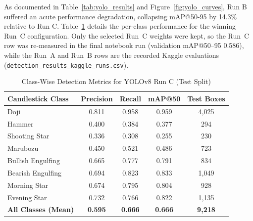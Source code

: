 \documentclass[10pt,journal]{IEEEtran}
\begin{document}
\begin{table}[htbp]
\centering
\caption{YOLOv8 Test Split Object Detection Performance (From Scratch)}
\label{tab:yolo_results}
\end{table}

As documented in Table~\ref{tab:yolo_results} and Figure~\ref{fig:yolo_curves}, Run B suffered an acute performance degradation, collapsing mAP@50-95 by 14.3\% relative to Run C. Table~\ref{tab:yolo_class} details the per-class performance for the winning Run~C configuration. Only the selected Run~C weights were kept, so the Run~C row was re-measured in the final notebook run (validation mAP@50--95 0.586), while the Run~A and Run~B rows are the recorded Kaggle evaluations (\texttt{detection\_results\_kaggle\_runs.csv}).

\begin{table}[htbp]
\centering
\caption{Class-Wise Detection Metrics for YOLOv8 Run C (Test Split)}
\label{tab:yolo_class}
\begin{tabular}{lcccc}
\toprule
\textbf{Candlestick Class} & \textbf{Precision} & \textbf{Recall} & \textbf{mAP@50} & \textbf{Test Boxes} \\
\midrule
Doji              & 0.811 & 0.958 & 0.959 & 4,025 \\
Hammer            & 0.400 & 0.384 & 0.377 & 294 \\
Shooting Star     & 0.336 & 0.308 & 0.255 & 230 \\
Marubozu          & 0.450 & 0.521 & 0.486 & 723 \\
Bullish Engulfing & 0.665 & 0.777 & 0.791 & 834 \\
Bearish Engulfing & 0.694 & 0.823 & 0.833 & 1,049 \\
Morning Star      & 0.674 & 0.795 & 0.804 & 928 \\
Evening Star      & 0.732 & 0.766 & 0.822 & 1,135 \\
\midrule
\textbf{All Classes (Mean)} & \textbf{0.595} & \textbf{0.666} & \textbf{0.666} & \textbf{9,218} \\
\bottomrule
\end{tabular}
\end{table}
\end{document}
